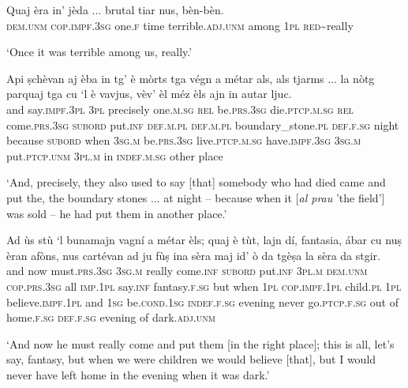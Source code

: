 \begin{linenumbers}
\gll Quaj èra in’ jèda ... brutal tiar nus, bèn-bèn.   \\
\textsc{dem.unm} \textsc{cop.impf.3sg} one.\textsc{f} time {} terrible.\textsc{adj.unm} among \textsc{1pl} \textsc{red}\textasciitilde{really}\\
\end{linenumbers}
\medskip
\glt `Once it was terrible among us, really.'
\medskip

\begin{linenumbers}
\gll  Api ṣchèvan aj èba in tg’ è mòrts tga végn a métar als, als tjarms ... la nòtg parquaj tga cu `l è vavjus, vèv’ èl méz èls ajn in autar ljuc.  \\
and say.\textsc{impf.3pl} \textsc{3pl} precisely one.\textsc{m.sg} \textsc{rel} be.\textsc{prs.3sg} die.\textsc{ptcp.m.sg} \textsc{rel} come.\textsc{prs.3sg} \textsc{subord} put.\textsc{inf} \textsc{def.m.pl} \textsc{def.m.pl} boundary\_stone.\textsc{pl} {} \textsc{def.f.sg} night because \textsc{subord} when \textsc{3sg.m} be.\textsc{prs.3sg} live.\textsc{ptcp.m.sg} have.\textsc{impf.3sg} \textsc{3sg.m} put.\textsc{ptcp.unm} \textsc{3pl.m} in \textsc{indef.m.sg} other place \\
\end{linenumbers}
\medskip
\glt `And, precisely, they also used to say [that] somebody who had died came and put the, the boundary stones ... at night – because when it [\textit{al prau} 'the field'] was sold – he had put them in another place.'
\medskip

\begin{linenumbers}
\gll Ad ùs stù `l bunamajn vagní a métar èls; quaj è tùt, lajn dí, fantasia, ábar cu nuṣ èran afòns, nus cartévan ad ju fùṣ ina sèra maj id’ ò da tgèṣa la sèra da stgir. \\
and now must.\textsc{prs.3sg} \textsc{3sg.m} really come.\textsc{inf} \textsc{subord} put.\textsc{inf} \textsc{3pl.m} \textsc{dem.unm} \textsc{cop.prs.3sg} all \textsc{imp.1pl} say.\textsc{inf} fantasy.\textsc{f.sg} but when \textsc{1pl} \textsc{cop.impf.1pl} child.\textsc{pl} \textsc{1pl} believe.\textsc{impf.1pl} and \textsc{1sg} be.\textsc{cond.1sg} \textsc{indef.f.sg} evening never go.\textsc{ptcp.f.sg} out of home.\textsc{f.sg} \textsc{def.f.sg} evening of dark.\textsc{adj.unm}\\
  \end{linenumbers}
\medskip
\glt `And now he must really come and put them [in the right place]; this is all, let’s say, fantasy, but when we were children we would believe [that], but I would never have left home in the evening when it was dark.'
\medskip

